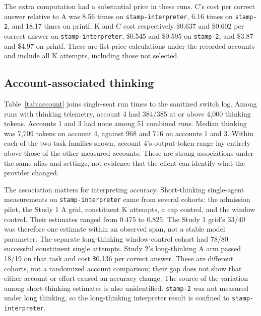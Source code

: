 The extra computation had a substantial price in these runs. C's cost per correct answer relative to A was 8.56 times on \texttt{stamp-interpreter}, 6.16 times on \texttt{stamp-2}, and 18.17 times on printf. K and C cost respectively \$0.637 and \$0.602 per correct answer on \texttt{stamp-interpreter}, \$0.545 and \$0.595 on \texttt{stamp-2}, and \$3.87 and \$4.97 on printf. These are list-price calculations under the recorded accounts and include all K attempts, including those not selected.

\subsection{Account-associated thinking}
\label{sec:results-account}

Table~\ref{tab:account} joins single-seat run times to the sanitized switch log. Among runs with thinking telemetry, account 4 had 384/385 at or above 4,000 thinking tokens. Accounts 1 and 3 had none among 51 combined runs. Median thinking was 7,709 tokens on account 4, against 968 and 716 on accounts 1 and 3. Within each of the two task families shown, account 4's output-token range lay entirely above those of the other measured accounts. These are strong associations under the same alias and settings, not evidence that the client can identify what the provider changed.

\begin{table}[t]
\centering
\scriptsize
\caption{Recorded subscription account and run-level thinking or output tokens. Generated from the per-run records joined to the account-switch log.}
\label{tab:account}

\end{table}

The association matters for interpreting accuracy. Short-thinking single-agent measurements on \texttt{stamp-interpreter} came from several cohorts: the admission pilot, the Study 1 A grid, constituent K attempts, a cap control, and the window control. Their estimates ranged from $0.475$ to $0.825$. The Study 1 grid's 33/40 was therefore one estimate within an observed span, not a stable model parameter. The separate long-thinking window-control cohort had 78/80 successful constituent single attempts. Study 2's long-thinking A arm passed 18/19 on that task and cost \$0.136 per correct answer. These are different cohorts, not a randomized account comparison; their gap does not show that either account or effort caused an accuracy change. The source of the variation among short-thinking estimates is also unidentified. \texttt{stamp-2} was not measured under long thinking, so the long-thinking interpreter result is confined to \texttt{stamp-interpreter}.

